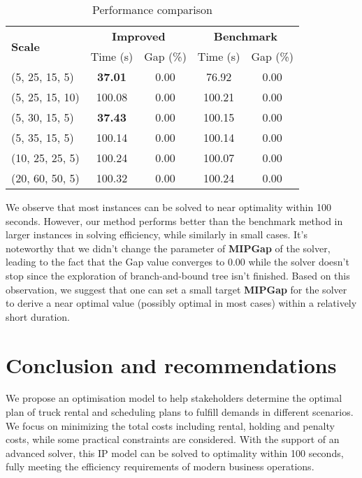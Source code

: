 \documentclass[a4paper,12pt]{article}
\begin{document}
\begin{table}[htbp]
    \centering
    \caption{Performance comparison}
    \label{tab:method-comparison}
    \begin{tabular}{lcc|cc}
        \toprule
        \multirow{2}{*}{\textbf{Scale}} & \multicolumn{2}{c|}{\textbf{Improved}} & \multicolumn{2}{c}{\textbf{Benchmark}} \\
        & Time (s) & Gap (\%) & Time (s) & Gap (\%) \\
        \midrule
        (5, 25, 15, 5)   & \textbf{37.01} & 0.00 & 76.92  & 0.00  \\
        (5, 25, 15, 10)   & 100.08 & 0.00 & 100.21  & 0.00  \\
        (5, 30, 15, 5)   & \textbf{37.43}  & 0.00 & 100.15  & 0.00  \\
        (5, 35, 15, 5)  & 100.14  & 0.00 & 100.14  & 0.00 \\
        (10, 25, 25, 5) & 100.24 & 0.00 & 100.07 & 0.00 \\
        (20, 60, 50, 5) & 100.32 & 0.00 & 100.24 & 0.00 \\
        \bottomrule
    \end{tabular}
\end{table}

We observe that most instances can be solved to near optimality within 100 seconds. However, our method performs better than the benchmark method in larger instances in solving efficiency, while similarly in small cases. It's noteworthy that we didn't change the parameter of \textbf{MIPGap} of the solver, leading to the fact that the Gap value converges to 0.00 while the solver doesn't stop since the exploration of branch-and-bound tree isn't finished. Based on this observation, we suggest that one can set a small target \textbf{MIPGap} for the solver to derive a near optimal value (possibly optimal in most cases) within a relatively short duration.

\section{Conclusion and recommendations}\label{sec:conclusion-and-recommendations}

We propose an optimisation model to help stakeholders determine the optimal plan of truck rental and scheduling plans to fulfill demands in different scenarios. We focus on minimizing the total costs including rental, holding and penalty costs, while some practical constraints are considered. With the support of an advanced solver, this IP model can be solved to optimality within 100 seconds, fully meeting the efficiency requirements of modern business operations.
\end{document}
